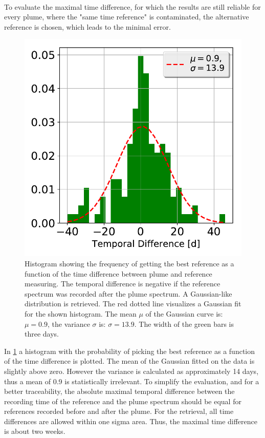 \\
To evaluate the maximal time difference, for which the results are still reliable for every plume, where the "same time reference" is contaminated, the alternative reference is chosen, which leads to the minimal  error.\\
\begin{figure}[h!]
    \centering
    \includegraphics[width=0.7\linewidth]{Bilder/Hist}
    \caption[Histogram showing the frequency of getting the best reference as a function of the time difference between plume and reference measuring.]{Histogram showing the frequency of getting the best reference as a function of the time difference between plume and reference measuring. The temporal difference is negative if the reference spectrum was recorded after the plume spectrum. A Gaussian-like distribution is retrieved. The red dotted line visualizes a Gaussian fit for the shown histogram. The mean $\mu$ of the Gaussian curve is: $\mu = 0.9$, the variance $\sigma$ is: $\sigma = 13.9$. The width of the green bars is three days.}
    \label{fig:Hist}
\end{figure}
%
In \cref{fig:Hist} a histogram with the probability of picking the best reference as a function of the time difference is plotted. The mean of the Gaussian fitted on the data is slightly above zero. However the variance is calculated as approximately 14 days, thus a mean of 0.9 is statistically irrelevant. To simplify the evaluation, and for a better traceability, the absolute maximal temporal difference between the recording time of the reference and the plume spectrum should be equal for references recorded before and after the plume. For the retrieval, all time differences are allowed within one sigma area. Thus, the maximal time difference is about two weeks.\\

